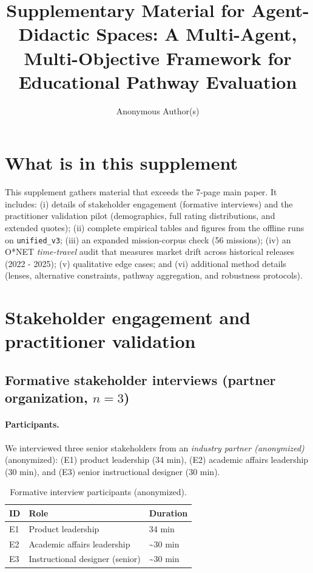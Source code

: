 \documentclass{article}
\title{Supplementary Material for Agent-Didactic Spaces: A Multi-Agent, Multi-Objective Framework for Educational Pathway Evaluation}
\author{
Anonymous Author(s)
\affiliations{Paper under double-blind review}
\emails{anonymous@domain}
}
\newcommand{\IndustryPartner}{\textit{industry partner (anonymized)}}
\begin{document}
\maketitle

\renewcommand{\thetable}{S\arabic{table}}
\renewcommand{\thefigure}{S\arabic{figure}}
\setcounter{table}{0}
\setcounter{figure}{0}


\section{What is in this supplement}
This supplement gathers material that exceeds the 7-page main paper. It includes:
(i) details of stakeholder engagement (formative interviews) and the practitioner validation pilot (demographics, full rating distributions, and extended quotes);
(ii) complete empirical tables and figures from the offline runs on \texttt{unified\_v3};
(iii) an expanded mission-corpus check (56 missions);
(iv) an O*NET \emph{time-travel} audit that measures market drift across historical releases (2022 - 2025);
(v) qualitative edge cases; and
(vi) additional method details (lenses, alternative constraints, pathway aggregation, and robustness protocols).


\section{Stakeholder engagement and practitioner validation}
\label{sec:supp-stakeholder}

\subsection{Formative stakeholder interviews (partner organization, $n{=}3$)}
\paragraph{Participants.} We interviewed three senior stakeholders from an \IndustryPartner (anonymized):
(E1) product leadership (34 min),
(E2) academic affairs leadership (30 min), and
(E3) senior instructional designer (30 min).

\begin{table}[h]
\centering
\small
\caption{Formative interview participants (anonymized).}
\label{tab:expert-participants}
\begin{tabular}{@{}lll@{}}
\toprule
ID & Role & Duration\\
\midrule
E1 & Product leadership & 34 min\\
E2 & Academic affairs leadership & \textasciitilde 30 min\\
E3 & Instructional designer (senior) & \textasciitilde 30 min\\
\bottomrule
\end{tabular}
\end{table}
\end{document}

